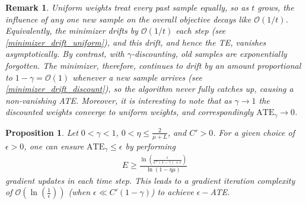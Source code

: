 \documentclass[conference]{IEEEtran}
\newcommand{\fraz}[1]{\textcolor{purple}{\bf [Fraz: #1]}}
\newtheorem{prop}{Proposition}
\newtheorem{remark}{Remark}
\begin{document}
\begin{remark}
\label{Remark:gamma_to_one}
Uniform weights treat every past sample equally, so as $t$ grows, the influence of any one new sample on the overall objective decays like $\mathcal{O}(1/t)$.  Equivalently, the minimizer drifts by $\mathcal{O}(1/t)$ each step (see \eqref{minimizer_drift_uniform}), and this drift, and hence the TE, vanishes asymptotically.  By contrast, with $\gamma$-discounting, old samples are exponentially forgotten.  The minimizer, therefore, continues to drift by an amount proportional to $1-\gamma=\mathcal{O}(1)$ whenever a new sample arrives (see \eqref{minimizer_drift_discount}), so the algorithm never fully catches up, causing a non-vanishing ATE. Moreover, it is interesting to note that as $\gamma \to 1$ the discounted weights converge to uniform weights, and correspondingly 
$\text{ATE}_\gamma \to 0$.
\end{remark}


\begin{prop}
    Let $0 < \gamma <1$, $0<\eta \leq \frac{2}{\mu + L }$, and $C' >0$. For a given choice of $\epsilon >0$, one can ensure $\text{ATE}_\gamma\leq \epsilon$ by performing 
    \begin{align}
         E \geq \frac{\ln\left(\frac{\epsilon}{C'(1-\gamma) + \epsilon}\right)}{\ln(1- \eta\mu)}
    \label{iter_complexity}
    \end{align}
    gradient updates in each time step. This leads to a gradient iteration complexity of $\mathcal{O}(\ln(\frac{1}{\epsilon}))$ (when $\epsilon\ll C'(1-\gamma)$) to achieve $\epsilon-$ATE.
\end{prop}
\end{document}
